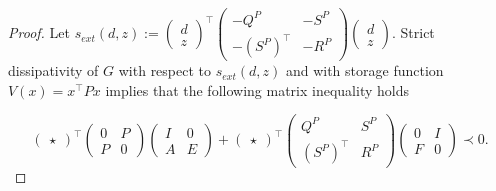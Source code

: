 \documentclass[10pt,a4paper]{amsart}
\begin{document}
\begin{proof}Let $s_{ext}(d,z):=\left(\begin{smallmatrix} d \\ z \end{smallmatrix}\right)^\top 
\left(\begin{smallmatrix} -Q^P & -S^P \\ -(S^P)^\top & -R^P \end{smallmatrix}\right)\left(\begin{smallmatrix} d \\ z \end{smallmatrix}\right)$. Strict dissipativity of $G$ with respect to $s_{ext}(d,z)$ and with storage function $V(x)=x^\top P x$ implies that the following matrix inequality holds

\begin{equation}
\label{DissLemma}
\begin{pmatrix}\star\end{pmatrix}^\top
\begin{pmatrix}0 & P \\ P & 0\end{pmatrix}
\begin{pmatrix}I & 0 \\ A & E\end{pmatrix}+
\begin{pmatrix}\star\end{pmatrix}^\top
\begin{pmatrix}Q^P & S^P \\ (S^P)^\top & R^P\end{pmatrix}
\begin{pmatrix}0 & I \\ F & 0\end{pmatrix} \prec 0.
\end{equation}


\end{proof}
\end{document}
